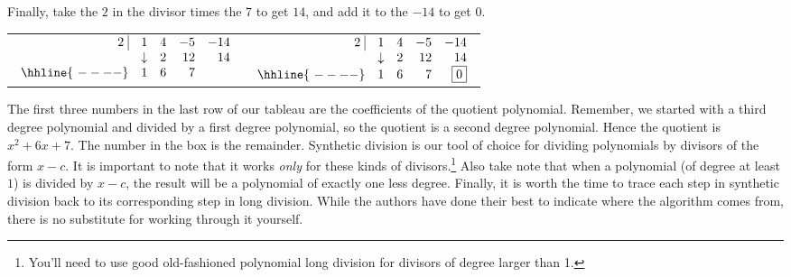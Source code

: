 Finally, take the $2$ in the divisor times the $7$ to get $14$, and add it to the $-14$ to get $0$.

\bigskip

\begin{center}

\begin{tabular}{cc}

$ \begin{array}{rrrrr}


  2 \, \, \vline& 1 & 4 & -5  & -14 \\

   & \downarrow &  2  &  12  & 14 \\ \hhline{~----} 
  & 1  &   6  & 7  &    \\  
\end{array}$ \hspace{1in} 

&

$ \begin{array}{rrrrr}


  2 \, \, \vline& 1 & 4 & -5  & -14 \\

   & \downarrow &  2  &  12  & 14 \\ \hhline{~----} 
  & 1  &   6  & 7  &  \fbox{$0$}  \\  
\end{array}$ \\



\end{tabular}

\end{center}

The first three numbers in the last row of our tableau are the coefficients of the quotient polynomial.  Remember, we started with a third degree polynomial and divided by a first degree polynomial, so the quotient is a second degree polynomial.  Hence the quotient is $x^2+6x+7$.  The number in the box is the remainder.  Synthetic division is our tool of choice for dividing polynomials by divisors of the form $x-c$.  It is important to note that it works \emph{only} for these kinds of divisors.\footnote{You'll need to use good old-fashioned polynomial long division for divisors of degree larger than 1.} Also take note that when a polynomial (of degree at least $1$) is divided by $x-c$, the result will be a polynomial of exactly one less degree. Finally, it is  worth the time to trace each step in synthetic division back to its corresponding step in long division.  While the authors have done their best to indicate where the algorithm comes from, there is no substitute for working through it yourself.

